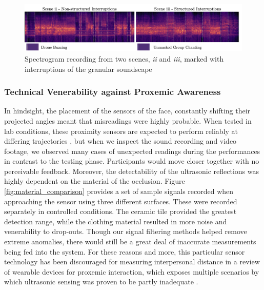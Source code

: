 \begin{figure}[!ht]
\centering
\includegraphics[width=\textwidth,keepaspectratio]{Chapters/Figures/adse_ess/interuptions-spectogram-markings-fig.png}
{\caption[Spectrogram recording from two scenes, \textit{ii} and \textit{iii}]{Spectrogram recording from two scenes, \textit{ii} and \textit{iii}, marked with interruptions of the granular soundscape}
\label{fig:interuptions-spectogram}}
\end{figure}

\subsubsection{Technical Venerability against Proxemic Awareness}
\label{subsec:accuracy}

In hindsight, the placement of the sensors of the face, constantly shifting their projected angles meant that misreadings were highly probable. When tested in lab conditions, these proximity sensors are expected to perform reliably at differing trajectories \citep{abreu_low-cost_2021}, but when we inspect the sound recording and video footage, we observed many cases of unexpected readings during the performances in contrast to the testing phase. Participants would move closer together with no perceivable feedback. Moreover, the detectability of the ultrasonic reflections was highly dependent on the material of the occlusion. Figure \ref{fig:material_comparison} provides a set of sample signals recorded when approaching the sensor using three different surfaces. These were recorded separately in controlled conditions. The ceramic tile provided the greatest detection range, while the clothing material resulted in more noise and venerability to drop-outs. Though our signal filtering methods helped remove extreme anomalies, there would still be a great deal of inaccurate measurements being fed into the system. For these reasons and more, this particular sensor technology has been discouraged for measuring interpersonal distance in a review of wearable devices for proxemic interaction, which exposes multiple scenarios by which ultrasonic sensing was proven to be partly inadequate \citep{montanari_measuring_2018}.

